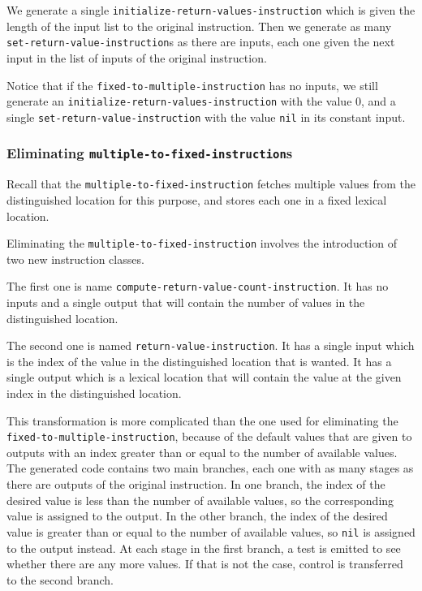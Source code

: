 We generate a single \texttt{initialize-return-values-instruction}
which is given the length of the input list to the original
instruction.  Then we generate as many
\texttt{set-return-value-instruction}s as there are inputs, each one
given the next input in the list of inputs of the original
instruction.

Notice that if the \texttt{fixed-to-multiple-instruction} has no
inputs, we still generate an
\texttt{initialize-return-values-instruction} with the value 0, and a
single \texttt{set-return-value-instruction} with the value
\texttt{nil} in its constant input.

\subsubsection{Eliminating \texttt{multiple-to-fixed-instruction}s}

Recall that the \texttt{multiple-to-fixed-instruction} fetches
multiple values from the distinguished location for this purpose, and
stores each one in a fixed lexical location.

Eliminating the \texttt{multiple-to-fixed-instruction} involves the
introduction of two new instruction classes.

The first one is name
\texttt{compute-return-value-count-instruction}.  It has no inputs and
a single output that will contain the number of values in the
distinguished location.

The second one is named \texttt{return-value-instruction}.  It has a
single input which is the index of the value in the distinguished
location that is wanted.  It has a single output which is a lexical
location that will contain the value at the given index in the
distinguished location.

This transformation is more complicated than the one used for
eliminating the \texttt{fixed-to-multiple-instruction}, because of the
default values that are given to outputs with an index greater than or
equal to the number of available values.  The generated code contains
two main branches, each one with as many stages as there are outputs
of the original instruction.  In one branch, the index of the desired
value is less than the number of available values, so the
corresponding value is assigned to the output.  In the other branch,
the index of the desired value is greater than or equal to the number
of available values, so \texttt{nil} is assigned to the output
instead.  At each stage in the first branch, a test is emitted to see
whether there are any more values.  If that is not the case, control
is transferred to the second branch.

